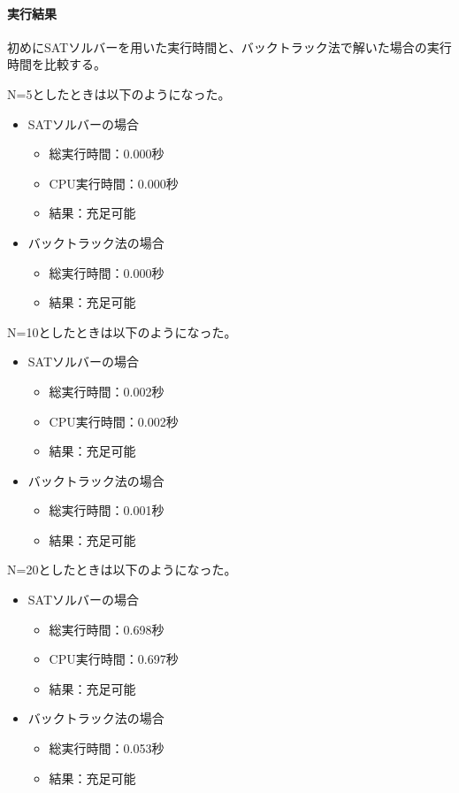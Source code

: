 \documentclass[dvipdfmx]{jsarticle}
\begin{document}
\paragraph{実行結果}\par
初めにSATソルバーを用いた実行時間と、バックトラック法で解いた場合の実行時間を比較する。\par
N=5としたときは以下のようになった。
\begin{itemize}
  \item SATソルバーの場合
  \begin{itemize}
    \item 総実行時間：0.000秒
    \item CPU実行時間：0.000秒
    \item 結果：充足可能
  \end{itemize}
  \item バックトラック法の場合
  \begin{itemize}
    \item 総実行時間：0.000秒
    \item 結果：充足可能
  \end{itemize}
\end{itemize}
N=10としたときは以下のようになった。
\begin{itemize}
  \item SATソルバーの場合
  \begin{itemize}
    \item 総実行時間：0.002秒
    \item CPU実行時間：0.002秒
    \item 結果：充足可能
  \end{itemize}
  \item バックトラック法の場合
  \begin{itemize}
    \item 総実行時間：0.001秒
    \item 結果：充足可能
  \end{itemize}
\end{itemize}
N=20としたときは以下のようになった。
\begin{itemize}
  \item SATソルバーの場合
  \begin{itemize}
    \item 総実行時間：0.698秒
    \item CPU実行時間：0.697秒
    \item 結果：充足可能
  \end{itemize}
  \item バックトラック法の場合
  \begin{itemize}
    \item 総実行時間：0.053秒
    \item 結果：充足可能
  \end{itemize}
\end{itemize}
\end{document}
